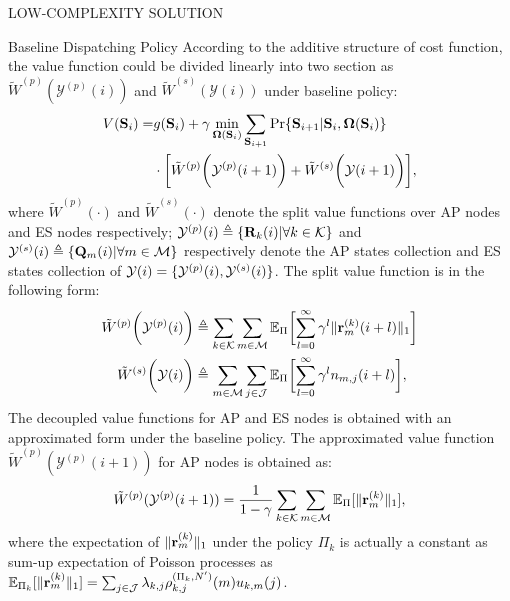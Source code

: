 \documentclass[10pt, conference, letterpaper]{IEEEtran}
\newcommand{\mat}{\mathbf}
\newcommand{\define}{\triangleq}
\renewcommand{\vec}{\mathbf}
\DeclarePairedDelimiter{\set}{\{}{\}}
\DeclarePairedDelimiter{\Inorm}{\|}{\|_1}
\DeclarePairedDelimiter{\Paren}{\bigg(}{\bigg)}
\DeclarePairedDelimiter{\Bracket}{\bigg[}{\bigg]}
\newcommand{\apSet}{\mathcal{K}}
\newcommand{\esSet}{\mathcal{M}}
\newcommand{\jSpace}{\mathcal{J}}
\newcommand{\Stat}{\mathbf{S}}
\newcommand{\Obsv}{\mathcal{Y}}
\newcommand{\Policy}{\boldsymbol{\Omega}}
\newcommand{\BPolicy}{\Policy} %
\begin{document}
\begin{section}{LOW-COMPLEXITY SOLUTION}
\begin{subsection}{Baseline Dispatching Policy}
            According to the additive structure of cost function, the value function could be divided linearly into two section as $\tilde{W}^{(p)}(\Obsv^{(p)}(i))$ and $\tilde{W}^{(s)}(\Obsv(i))$ under baseline policy:
            \begin{align}
                V(\Stat_{i}) =& 
                    g(\Stat_{i}) + \gamma \min_{\BPolicy(\Stat_{i})} \sum_{\Stat_{i+1}} \Pr\{ \Stat_{i+1}|\Stat_{i}, \BPolicy(\Stat_{i}) \}
                    \nonumber\\
                    & \cdot \Bracket{ \tilde{W}^{(p)}\Paren{\Obsv^{(p)}(i+1)} + \tilde{W}^{(s)}\Paren{\Obsv(i+1)} },
            \end{align}
            where $\tilde{W}^{(p)}(\cdot)$ and $\tilde{W}^{(s)}(\cdot)$ denote the split value functions over AP nodes and ES nodes respectively; $\Obsv^{(p)}(i) \define \set{\mat{R}_k(i)|\forall k\in\apSet}$ and $\Obsv^{(s)}(i) \define \set{\vec{Q}_m(i)|\forall m\in\esSet}$ respectively denote the AP states collection and ES states collection of $\Obsv(i) = \set{\Obsv^{(p)}(i), \Obsv^{(s)}(i)}$. The split value function is in the following form:
            \begin{align}
                \tilde{W}^{(p)}\Paren{\Obsv^{(p)}(i)} &\define \sum_{k\in\apSet}\sum_{m\in\esSet}
                    \mathbb{E}_{\Pi}\Bracket{
                        \sum_{l=0}^{\infty} \gamma^{l} \Inorm{\vec{r}^{(k)}_{m}(i+l)}
                    }
                \\
                \tilde{W}^{(s)}\Paren{\Obsv(i)} &\define \sum_{m\in\esSet}\sum_{j\in\jSpace}
                    \mathbb{E}_{\Pi}\Bracket{
                        \sum_{l=0}^{\infty} \gamma^{l} n_{m,j}(i+l)
                    },
            \end{align}
            The decoupled value functions for AP and ES nodes is obtained with an approximated form under the baseline policy.
            The approximated value function $\tilde{W}^{(p)}(\Obsv^{(p)}(i+1))$ for AP nodes is obtained as:
            \begin{align}
                \tilde{W}^{(p)}(\Obsv^{(p)}(i+1)) = \frac{1}{1-\gamma}
                    \sum_{k\in\apSet}\sum_{m\in\esSet} \mathbb{E}_{\Pi}[\Inorm{\vec{r}^{(k)}_{m}}],
            \end{align}
            where the expectation of $\Inorm{\vec{r}^{(k)}_{m}}$ under the policy $\Pi_k$ is actually a constant as sum-up expectation of Poisson processes as $\mathbb{E}_{\Pi_k}[\Inorm{\vec{r}^{(k)}_{m}}] = \sum_{j\in\jSpace} \lambda_{k,j} \rho^{(\Pi_k,N')}_{k,j}(m) u_{k,m}(j)$.
            

\end{subsection}
\end{section}
\end{document}
